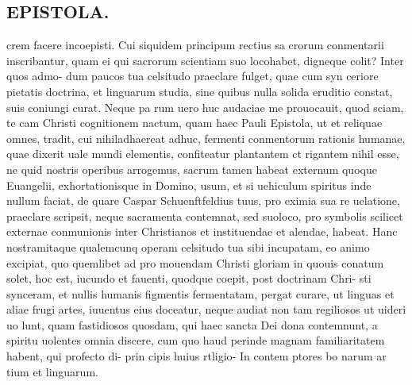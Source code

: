 \documentclass{article}
\begin{document}
\begin{pages}
\section*{EPISTOLA. }\pstart crem facere incoepisti. Cui siquidem principum rectius sa crorum conmentarii inscribantur, quam ei qui sacrorum scientiam suo locohabet, digneque colit? Inter quos admo- dum paucos tua celsitudo praeclare fulget, quae cum syn ceriore pietatis doctrina, et linguarum studia, sine quibus nulla solida eruditio constat, suis coniungi curat. Neque pa rum uero huc audaciae me prouocauit, quod sciam, te cam Christi cognitionem nactum, quam haec Pauli Epistola, ut et reliquae omnes, tradit, cui nihiladhaereat adhuc, fermenti conmentorum rationis humanae, quae dixerit uale mundi elementis, confiteatur plantantem ct rigantem nihil esse, ne quid nostris operibus arrogemus, sacrum tamen habeat externum quoque Euangelii, exhortationisque in Domino, usum, et si uehiculum spiritus inde nullum faciat, de quare Caspar Schuenftfeldius tuus, pro eximia sua re uelatione, praeclare scripsit, neque sacramenta contemnat, sed suoloco, pro symbolis scilicet externae conmunionis inter Christianos et instituendae et alendae, habeat.  \pend\pstart Hanc nostramitaque qualemcunq operam celsitudo tua sibi incupatam, eo animo excipiat, quo quemlibet ad pro mouendam Christi gloriam in quouis conatum solet, hoc est, iucundo et fauenti, quodque coepit, post doctrinam Chri- sti synceram, et nullis humanis figmentis fermentatam, pergat curare, ut linguas et aliae frugi artes, iuuentus eius doceatur, neque audiat non tam regiliosos ut uideri uo lunt, quam fastidiosos quosdam, qui haec sancta Dei dona contemnunt, a spiritu uolentes omnia discere, cum quo haud perinde magnam familiaritatem habent, qui profecto di-  \pendPura prin cipis huius rtligio- In contem ptores bo narum ar tium et linguarum. 

\end{pages}
\end{document}

